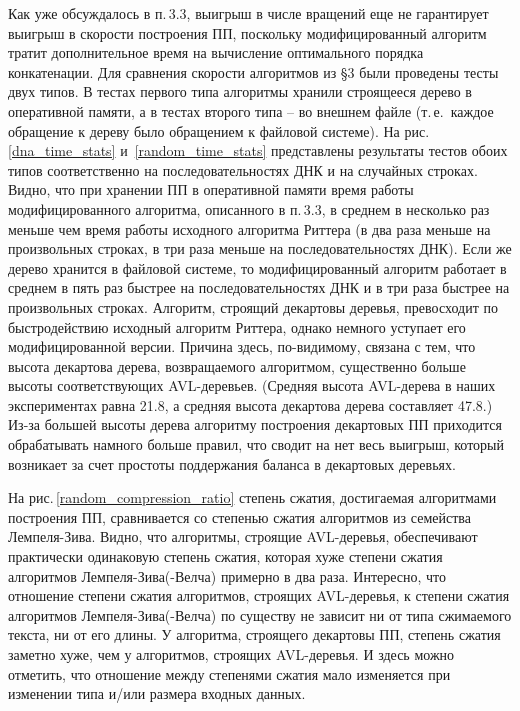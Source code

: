 ﻿\documentclass[11pt]{article}
\theoremstyle{remark}
\begin{document}
Как уже обсуждалось в п.\,3.3, выигрыш в числе вращений еще не гарантирует выигрыш в скорости построения ПП, поскольку модифицированный
алгоритм тратит дополнительное время на вычисление оптимального порядка конкатенации. Для сравнения скорости алгоритмов из \S3 были
проведены тесты двух типов. В тестах первого типа алгоритмы хранили строящееся дерево в оперативной памяти, а в тестах второго типа -- во
внешнем файле (т.\,е.\ каждое обращение к дереву было обращением к файловой системе). На рис.\,\ref{dna_time_stats}
и~\ref{random_time_stats} представлены результаты тестов обоих типов соответственно на последовательностях ДНК и на случайных строках.
Видно, что при хранении ПП в оперативной памяти время работы модифицированного алгоритма, описанного в п.\,3.3, в 
среднем в несколько раз меньше чем время работы исходного алгоритма Риттера (в два раза меньше на произвольных строках,
в три раза меньше на последовательностях ДНК). Если же дерево хранится в файловой системе, то модифицированный алгоритм
работает в среднем в пять раз быстрее на последовательностях ДНК и в три раза быстрее на произвольных строках. Алгоритм,
строящий декартовы деревья, превосходит по быстродействию исходный алгоритм Риттера, однако немного уступает его
модифицированной версии. Причина здесь, по-видимому, связана с тем, что высота декартова дерева, возвращаемого
алгоритмом, существенно больше высоты соответствующих AVL-деревьев. (Средняя высота AVL-дерева в наших экспериментах
равна 21.8, а средняя высота декартова дерева составляет 47.8.) Из-за большей высоты дерева алгоритму построения
декартовых ПП приходится обрабатывать намного больше правил, что сводит на нет весь выигрыш, который возникает за счет
простоты поддержания баланса в декартовых деревьях.

На рис.\,\ref{random_compression_ratio} степень сжатия, достигаемая алгоритмами построения ПП, сравнивается со степенью сжатия алгоритмов
из семейства Лемпеля-Зива. Видно, что алгоритмы, строящие AVL-деревья, обеспечивают практически одинаковую степень сжатия, которая хуже
степени сжатия алгоритмов Лемпеля-Зива(-Велча) примерно в два раза. Интересно, что отношение степени сжатия алгоритмов, строящих
AVL-деревья, к степени сжатия алгоритмов Лемпеля-Зива(-Велча) по существу не зависит ни от типа сжимаемого текста, ни от его длины. У
алгоритма, строящего декартовы ПП, степень сжатия заметно хуже, чем у алгоритмов, строящих AVL-деревья. И здесь можно отметить, что
отношение между степенями сжатия мало изменяется при изменении типа и/или размера входных данных.
\end{document}
